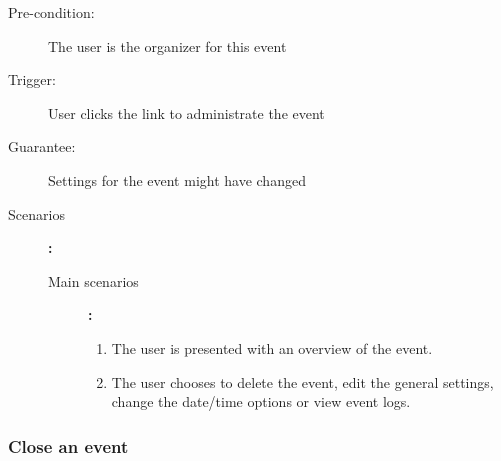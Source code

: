 \begin{description}
	\item[Pre-condition:] The user is the organizer for this event
	\item[Trigger:] User clicks the link to administrate the event
	\item[Guarantee:] Settings for the event might have changed
	\item[Scenarios]\textbf{:}\\
				\begin{description}
					\item[Main scenarios]\textbf{:}\\
								\begin{enumerate}
									\item The user is presented with an overview of the event.
									\item The user chooses to delete the event, edit the general settings, change the date/time options or view event logs.
								\end{enumerate}
				\end{description}
\end{description}

\subsubsection{Close an event}

